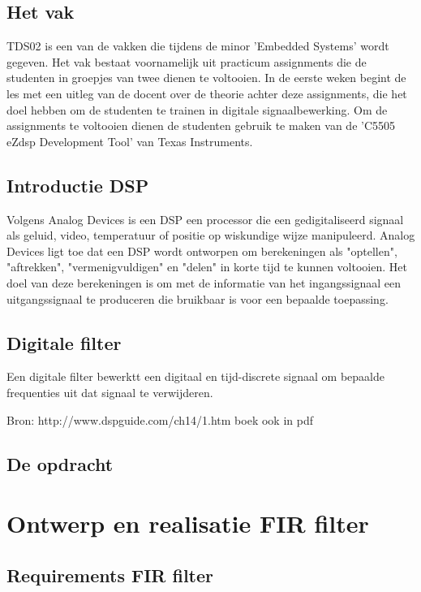 \documentclass[11pt,a4paper]{article}
\begin{document}
		\subsection{Het vak}
		TDS02 is een van de vakken die tijdens de minor 'Embedded Systems' wordt gegeven. Het vak bestaat voornamelijk uit practicum assignments die de studenten in groepjes van twee dienen te voltooien. In de eerste weken begint de les met een uitleg van de docent over de theorie achter deze assignments, die het doel hebben om de studenten te trainen in digitale signaalbewerking. Om de assignments te voltooien dienen de studenten gebruik te maken van de 'C5505 eZdsp Development Tool' van Texas Instruments.
		
		\subsection{Introductie DSP}
		Volgens Analog Devices \cite{analog} is een DSP een processor die een  	gedigitaliseerd signaal als geluid, video, temperatuur of positie op wiskundige wijze manipuleerd. Analog Devices ligt toe dat een DSP wordt ontworpen om berekeningen als "optellen", "aftrekken", "vermenigvuldigen" en "delen" in korte tijd te kunnen voltooien. Het doel van deze berekeningen is om met de informatie van het ingangssignaal een uitgangssignaal te produceren die bruikbaar is voor een bepaalde toepassing. 
		
		\subsection{Digitale filter}
		Een digitale filter bewerktt een digitaal en tijd-discrete signaal om bepaalde frequenties uit dat signaal te verwijderen.
		
		Bron: http://www.dspguide.com/ch14/1.htm
		boek ook in pdf  			
		
		\subsection{De opdracht}		
		
				
	
	\section{Ontwerp en realisatie FIR filter}
	
		\subsection{Requirements FIR filter}
	
\end{document}
